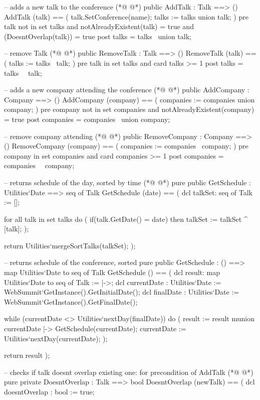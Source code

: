 \begin{vdmpp}[breaklines=true]
  -- adds a new talk to the conference
(*@
\label{AddTalk:76}
@*)
  public AddTalk : Talk ==> ()
    AddTalk (talk) == (
      talk.SetConference(name);
     talks := talks union {talk};
    )
    pre talk not in set talks and notAlreadyExistent(talk) = true and (DoesntOverlap(talk)) = true
   post talks = talks~ union {talk};
   
  -- remove Talk
(*@
\label{RemoveTalk:85}
@*)
  public RemoveTalk : Talk ==> ()
    RemoveTalk (talk) == (
     talks := talks \ {talk};
    )
    pre talk in set talks and card talks >= 1
   post talks = talks~ \ {talk};
    
 -- adds a new company attending the conference
(*@
\label{AddCompany:93}
@*)
  public AddCompany : Company ==> ()
    AddCompany (company) == (
     companies := companies union {company};
    )
    pre company not in set companies and notAlreadyExistent(company) = true
   post companies = companies~ union {company};
   
 -- remove company attending
(*@
\label{RemoveCompany:101}
@*)
 public RemoveCompany : Company ==> ()
    RemoveCompany (company) == (
     companies := companies \ {company};
    )
    pre company in set companies and card companies >= 1
   post companies = companies~ \ {company};
   
  -- returns schedule of the day, sorted by time
(*@
\label{GetSchedule:109}
@*)
 pure public GetSchedule : Utilities`Date ==> seq of Talk
    GetSchedule (date) == (
      dcl talkSet: seq of Talk := [];
      
     for all talk in set talks do (
     if(talk.GetDate() = date)
      then talkSet := talkSet ^ [talk];
     );
 
     return Utilities`mergeSortTalks(talkSet);
    );
    
  -- returns schedule of the conference, sorted
   pure public GetSchedule : () ==> map Utilities`Date to seq of Talk
    GetSchedule () == (
     dcl result: map Utilities`Date to seq of Talk := {|->};
      dcl currentDate : Utilities`Date := WebSummit`GetInstance().GetInitialDate();
      dcl finalDate : Utilities`Date := WebSummit`GetInstance().GetFinalDate();

      while (currentDate <> Utilities`nextDay(finalDate))
      do (
        result := result munion {currentDate |-> GetSchedule(currentDate)};
        currentDate := Utilities`nextDay(currentDate);
        );
     
     return result
    );

  -- checks if talk doesnt overlap existing one: for precondition of AddTalk
(*@
\label{DoesntOverlap:138}
@*)
  pure private DoesntOverlap : Talk ==> bool
    DoesntOverlap (newTalk) == (
    dcl doesntOverlap : bool := true;
    

\end{vdmpp}
